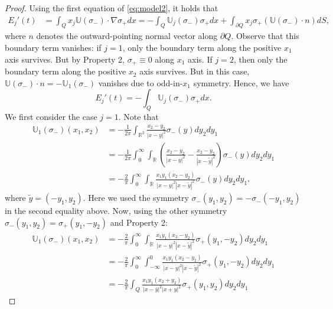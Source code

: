\documentclass[11pt,reqno]{amsproc}
\newcommand{\R}{\mathbb{R}}
\newcommand{\U}{\mathbb{U}}
\newcommand{\p}{\partial}
\begin{document}
\begin{proof}
    Using the first equation of \eqref{eq:model2}, it holds that
    \begin{equation}
        \label{eq:Ej'aux1}
        \begin{aligned}
        E_j'(t) &= \int_Q x_j\U(\sigma_-)\cdot \nabla \sigma_+ dx= -\int_Q \U_j(\sigma_-)\sigma_+ dx + \int_{\p Q} x_j\sigma_+ (\U(\sigma_-)\cdot n)dS,
        \end{aligned}
    \end{equation}
    where $n$ denotes the outward-pointing normal vector along $\p Q$. Observe that this boundary term vanishes: if $j = 1$, only the boundary term along the positive $x_1$ axis survives. But by Property 2, $\sigma_+ \equiv 0$ along $x_1$ axis. If $j = 2$, then only the boundary term along the positive $x_2$ axis survives. But in this case, $\U(\sigma_-) \cdot n = -\U_1(\sigma_-)$ vanishes due to odd-in-$x_1$ symmetry. Hence, we have
    \begin{equation}
        \label{eq:Ej'aux2}
        E_j'(t) = -\int_Q \U_j(\sigma_-)\sigma_+ dx.
    \end{equation}
    We first consider the case $j = 1$. Note that
    \begin{align*}
        \U_1(\sigma_-)(x_1,x_2) &= -\frac{1}{2\pi}\int_{\R^2} \frac{x_2 - y_2}{|x-y|^2} \sigma_-(y) dy_2 dy_1\\
        &= -\frac{1}{2\pi}\int_0^\infty \int_{\R} \left(\frac{x_2 - y_2}{|x-y|^2} - \frac{x_2 - y_2}{|x-\tilde{y}|^2}\right) \sigma_-(y)dy_2 dy_1\\
        &= -\frac2\pi \int_0^\infty \int_{\R} \frac{x_1y_1(x_2 - y_2)}{|x-y|^2|x-\tilde{y}|^2} \sigma_-(y)dy_2 dy_1,
    \end{align*}
    where $\tilde{y} = (-y_1,y_2)$. Here we used the symmetry $\sigma_-(y_1,y_2)= -\sigma_-(-y_1,y_2)$ in the second equality above. Now, using the other symmetry $\sigma_-(y_1, y_2) = \sigma_+(y_1,-y_2)$ and Property 2:
    \begin{align*}
        \U_1(\sigma_-)(x_1,x_2) &= -\frac2\pi \int_0^\infty \int_{\R} \frac{x_1y_1(x_2 - y_2)}{|x-y|^2|x-\tilde{y}|^2} \sigma_+(y_1,-y_2)dy_2 dy_1\\
        &= -\frac2\pi \int_0^\infty \int_{-\infty}^0 \frac{x_1y_1(x_2 - y_2)}{|x-y|^2|x-\tilde{y}|^2} \sigma_+(y_1,-y_2)dy_2 dy_1\\
        &= -\frac2\pi \int_Q \frac{x_1y_1(x_2 + y_2)}{|x-\bar{y}|^2|x+y|^2} \sigma_+(y_1,y_2)dy_2 dy_1
    \end{align*}

\end{proof}
\end{document}
